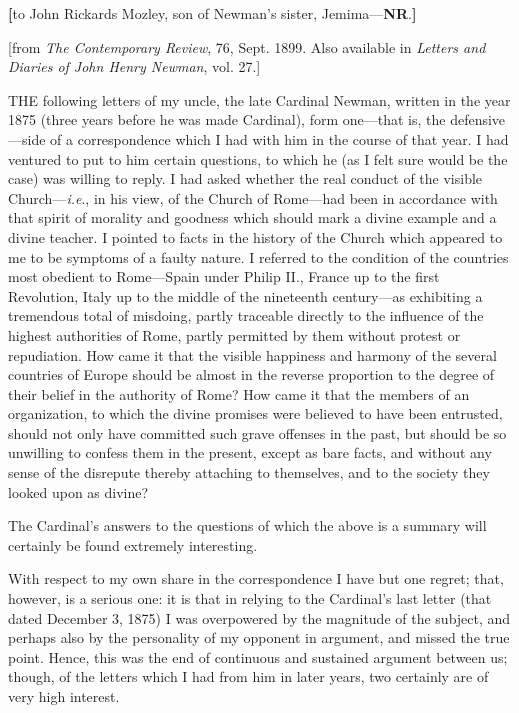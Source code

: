 
\textbf{[}to
John Rickards Mozley, son of Newman's sister, Jemima—\textbf{NR}.\textbf{]}

[from \emph{The
Contemporary Review}, 76, Sept. 1899. Also available in \emph{Letters
and Diaries of John Henry Newman}, vol. 27.]

THE
following letters of my uncle, the late Cardinal Newman, written in
the year 1875 (three years before he was made Cardinal), form
one—that is, the defensive—side of a correspondence which I had
with him in the course of that year. I had ventured to put to him
certain questions, to which he (as I felt sure would be the case) was
willing to reply. I had asked whether the real conduct of the visible
Church—\emph{i.e}., in his view, of the Church of Rome—had been in
accordance with that spirit of morality and goodness which should mark
a divine example and a divine teacher. I pointed to facts in the
history of the Church which appeared to me to be symptoms of a faulty
nature. I referred to the condition of the countries most obedient to
Rome—Spain under Philip II., France up to the first Revolution,
Italy up to the middle of the nineteenth century—as exhibiting a
tremendous total of misdoing, partly traceable directly to the
influence of the highest authorities of Rome, partly permitted by them
without protest or repudiation. How came it that the visible happiness
and harmony of the several countries of Europe should be almost in the
reverse proportion to the degree of their belief in the authority of
Rome? How came it that the members of an organization, to which the
divine promises were believed to have been entrusted, should not only
have committed such grave offenses in the past, but should be so
unwilling to confess them in the present, except as bare facts, and
without any sense of the disrepute thereby attaching to themselves,
and to the society they looked upon as divine?

The Cardinal's answers to the questions of which
the above is a summary will certainly be found extremely interesting.

With respect to my own share in the
correspondence I have but one regret; that, however, is a serious one:
it is that in relying to the Cardinal's last letter (that dated
December 3, 1875) I was overpowered by the magnitude of the subject,
and perhaps also by the personality of my opponent in argument, and
missed the true point. Hence, this was the end of continuous and
sustained argument between us; though, of the letters which I had from
him in later years, two certainly are of very high interest.

